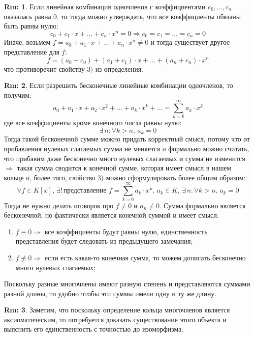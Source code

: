 \documentclass[12pt]{article}
\theoremstyle{definition}
\newtheorem{rem}{Rm:}
\newcommand{\ddsum}[2]{\displaystyle\sum\limits_{#1}^{#2}}
\begin{document}
\begin{rem}
	Если линейная комбинация одночленов с коэффициентами $c_0, \dotsc, c_n$ оказалась равна $0$, то тогда можно утверждать, что все коэффициенты обязаны быть равны нулю:
	$$
		c_0 + c_1{\cdot}x + \dotsc + c_n{\cdot}x^n = 0 \Rightarrow c_0 = c_1 = \dotsc = c_n = 0
	$$
	Иначе, возьмем $f = a_0 + a_1{\cdot}x + \dotsc + a_n{\cdot}x^n \neq 0$ и тогда существует другое представление для $f$:
	$$
		f = (a_0 + c_0) + (a_1 + c_1){\cdot}x + \dotsc + (a_n + c_n){\cdot}x^n
	$$
	что противоречит свойству $3)$ из определения.
\end{rem}
\begin{rem}
	Если разрешить бесконечные линейные комбинации одночленов, то получим:
	$$
		a_0 + a_1{\cdot}x + a_2{\cdot}x^2 + \dotsc + a_k {\cdot}x^k + \dotsc = \ddsum{k = 0}{\infty}a_k{\cdot}x^k
	$$
	где все коэффициенты кроме конечного числа равны нулю:
	$$
		\exists\, n \colon \forall k > n, \, a_k = 0
	$$
	Тогда такой бесконечной сумме можно придать корректный смысл, потому что от прибавления нулевых слагаемых сумма не меняется и формально можно считать, что прибавим даже бесконечно много нулевых слагаемых и сумма не изменится $\Rightarrow$ такая сумма сводится к конечной сумме, которая имеет смысл в нашем кольце и, более того, свойство $3)$ можно сформулировать более общим образом:
	$$
		\forall f \in K[x], \, \exists! \, \text{представление } f = \ddsum{k =0 }{\infty}a_k{\cdot}x^k, \,  a_k \in K, \, \exists \, n \colon \forall k > n, \, a_k = 0		
	$$
	Тогда не нужно делать оговорок про $f \neq 0$ и $a_n \neq 0$. Сумма формально является бесконечной, но фактически является конечной суммой и имеет смысл:
	\begin{enumerate}[label=\arabic*)]
		\item $f \equiv 0 \Rightarrow$ все коэффициенты будут равны нулю, единственность представления будет следовать из предыдущего замечания;
		\item $f\not\equiv 0\Rightarrow$ если есть какая-то конечная сумма, то можем дописать бесконечно много нулевых слагаемых;
	\end{enumerate}
	
	Поскольку разные многочлены имеют разную степень и представляются суммами разной длины, то удобно чтобы эти суммы имели одну и ту же длину. 
\end{rem}
\begin{rem}
	Заметим, что поскольку определение кольца многочленов является аксиоматическим, то потребуется доказать существование этого объекта и выяснить его единственность с точностью до изоморфизма.
\end{rem}
\end{document}
